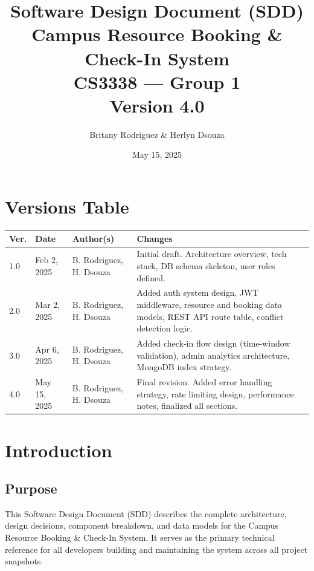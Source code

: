\documentclass[12pt]{article}
\title{
    \vspace{2cm}
    {\Large Software Design Document (SDD)} \\[1em]
    {\LARGE \textbf{Campus Resource Booking \& Check-In System}} \\[2em]
    {\large CS3338 --- Group 1} \\[0.5em]
    {\normalsize Version 4.0}
    \vspace{2cm}
}
\author{Britany Rodriguez \& Herlyn Dsouza}
\date{May 15, 2025}
\begin{document}
\maketitle
\thispagestyle{empty}
\newpage

\tableofcontents
\newpage

\section*{Versions Table}

\begin{longtable}{|p{1.4cm}|p{2.4cm}|p{4cm}|p{6cm}|}
\hline
\textbf{Ver.} & \textbf{Date} & \textbf{Author(s)} & \textbf{Changes} \\
\hline
1.0 & Feb 2, 2025  & B. Rodriguez, H. Dsouza & Initial draft. Architecture overview, tech stack, DB schema skeleton, user roles defined. \\
\hline
2.0 & Mar 2, 2025  & B. Rodriguez, H. Dsouza & Added auth system design, JWT middleware, resource and booking data models, REST API route table, conflict detection logic. \\
\hline
3.0 & Apr 6, 2025  & B. Rodriguez, H. Dsouza & Added check-in flow design (time-window validation), admin analytics architecture, MongoDB index strategy. \\
\hline
4.0 & May 15, 2025 & B. Rodriguez, H. Dsouza & Final revision. Added error handling strategy, rate limiting design, performance notes, finalized all sections. \\
\hline
\end{longtable}
\newpage

\section{Introduction}

\subsection{Purpose}
This Software Design Document (SDD) describes the complete architecture, design decisions, component breakdown, and data models for the Campus Resource Booking \& Check-In System. It serves as the primary technical reference for all developers building and maintaining the system across all project snapshots.
\end{document}
